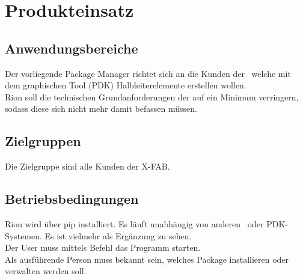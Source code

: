 \chapter{Produkteinsatz}

\section{Anwendungsbereiche}
Der vorliegende Package Manager richtet sich an die Kunden der \x~welche mit dem graphischen Tool (PDK) Halbleiterelemente erstellen wollen. \\
Rion soll die technischen Grundanforderungen der  auf ein Minimum verringern, sodass diese sich nicht mehr damit befassen müssen.

\section{Zielgruppen}
Die Zielgruppe sind alle Kunden der X-FAB.


\section{Betriebsbedingungen}
Rion wird über pip installiert. Es läuft unabhängig von anderen \x~oder PDK-Systemen. Es ist vielmehr als Ergänzung zu sehen.\\
Der User muss mittels Befehl das Programm starten.\\
Als ausführende Person muss bekannt sein, welches Package installieren oder verwalten werden soll.